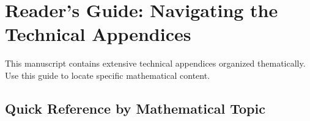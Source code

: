 \documentclass[11pt,a4paper]{report}
\begin{document}
\maketitle
\begin{abstract}

\end{abstract}
\tableofcontents
\newpage

\chapter*{Reader's Guide: Navigating the Technical Appendices}

This manuscript contains extensive technical appendices organized thematically. Use this guide to locate specific mathematical content.

\section*{Quick Reference by Mathematical Topic}
\end{document}

